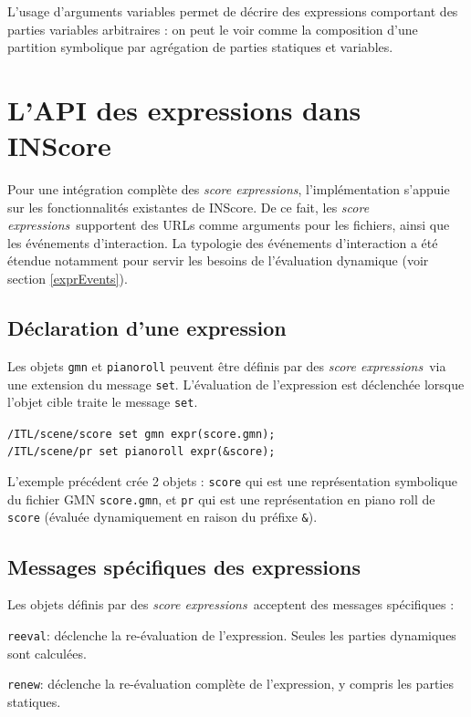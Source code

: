 \documentclass{article}
\newcommand{\OSC}[1]{\texttt{#1}}
\newcommand{\sExprs}{\emph{score expressions}}
\let\olditemize\itemize
\let\oldenditemize\enditemize
\renewenvironment{itemize} 	{\olditemize \setlength{\itemsep}{1mm}}{\oldenditemize}
\newcommand{\sample}	[1]			{\vspace{-0.2em}\begin{center}\colorbox{mygrey}{\begin{minipage}[t]{0.97\columnwidth} {\small \texttt{#1}}\end{minipage}}\end{center}}
\begin{document}
L'usage d'arguments variables permet de décrire des expressions comportant des parties variables arbitraires : on peut le voir comme la composition d'une partition symbolique par agrégation de parties statiques et variables.

\section{L'API des expressions dans INScore}
\label{exprAPI}

Pour une intégration complète des \sExprs, l'implémentation s'appuie sur les fonctionnalités existantes de INScore. De ce fait, les \sExprs\ supportent des URLs comme arguments pour les fichiers, ainsi que les événements d'interaction. La typologie des événements d'interaction a été étendue notamment pour servir les besoins de l'évaluation dynamique (voir section \ref{exprEvents}).

\subsection{Déclaration d'une expression}
\label{declaringExpr}
Les objets \OSC{gmn} et \OSC{pianoroll} peuvent être définis par des \sExprs\ via une extension du message \OSC{set}.
L'évaluation de l'expression est déclenchée lorsque l'objet cible traite le message \OSC{set}.

\sample{/ITL/scene/score set gmn expr(score.gmn); \\
/ITL/scene/pr set pianoroll expr(\&score);
}

L'exemple précédent crée 2 objets : \OSC{score} qui est une représentation symbolique du fichier GMN \OSC{score.gmn}, et \OSC{pr} qui est une représentation en piano roll de \OSC{score} (évaluée dynamiquement en raison du préfixe  \OSC{\&}).


\subsection{Messages spécifiques des expressions}
\label{exprMsgs}
Les objets définis par des \sExprs\ acceptent des messages spécifiques :
\begin{itemize}
\item \OSC{reeval}: déclenche la re-évaluation de l'expression. Seules les parties dynamiques sont calculées.
\item \OSC{renew}: déclenche la re-évaluation complète de l'expression, y compris les parties statiques. 
\end{itemize}
\end{document}

